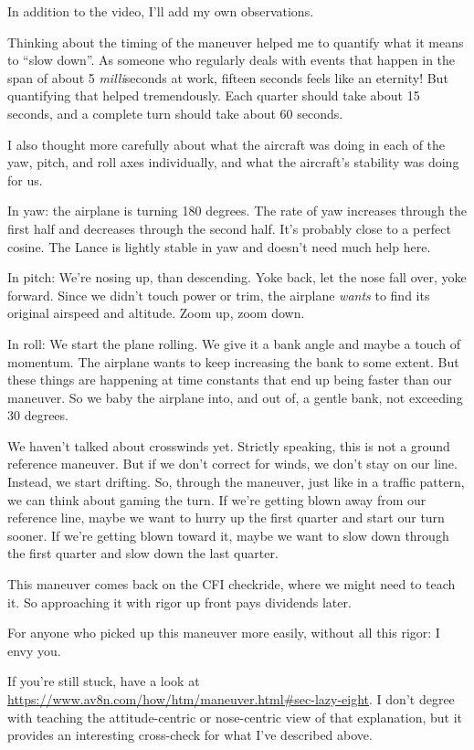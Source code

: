 In addition to the video, I'll add my own observations.

Thinking about the timing of the maneuver helped me to quantify what it means to ``slow down''. As someone who regularly deals with events that happen in the span of about 5 \emph{milli}seconds at work, fifteen seconds feels like an eternity! But quantifying that helped tremendously. Each quarter should take about 15 seconds, and a complete turn should take about 60 seconds.

I also thought more carefully about what the aircraft was doing in each of the yaw, pitch, and roll axes individually, and what the aircraft's stability was doing for us.

In yaw: the airplane is turning 180 degrees. The rate of yaw increases through the first half and decreases through the second half. It's probably close to a perfect cosine. The Lance is lightly stable in yaw and doesn't need much help here.

In pitch: We're nosing up, than descending. Yoke back, let the nose fall over, yoke forward. Since we didn't touch power or trim, the airplane \emph{wants} to find its original airspeed and altitude. Zoom up, zoom down.

In roll: We start the plane rolling. We give it a bank angle and maybe a touch of momentum. The airplane wants to keep increasing the bank to some extent. But these things are happening at time constants that end up being faster than our maneuver. So we baby the airplane into, and out of, a gentle bank, not exceeding 30 degrees.

We haven't talked about crosswinds yet. Strictly speaking, this is not a ground reference maneuver. But if we don't correct for winds, we don't stay on our line. Instead, we start drifting. So, through the maneuver, just like in a traffic pattern, we can think about gaming the turn. If we're getting blown away from our reference line, maybe we want to hurry up the first quarter and start our turn sooner. If we're getting blown toward it, maybe we want to slow down through the first quarter and slow down the last quarter.

This maneuver comes back on the CFI checkride, where we might need to teach it. So approaching it with rigor up front pays dividends later.

For anyone who picked up this maneuver more easily, without all this rigor: I envy you.

If you're still stuck, have a look at \url{https://www.av8n.com/how/htm/maneuver.html#sec-lazy-eight}. I don't degree with teaching the attitude-centric or nose-centric view of that explanation, but it provides an interesting cross-check for what I've described above.

